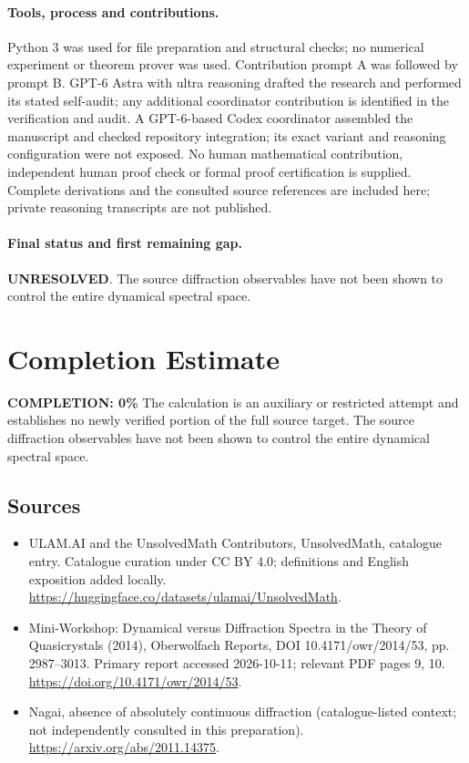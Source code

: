 \documentclass[11pt]{article}
\begin{document}
\paragraph{Tools, process and contributions.}
Python 3 was used for file preparation and structural checks; no numerical experiment or theorem prover was used. Contribution prompt A was followed by prompt B. GPT-6 Astra with ultra reasoning drafted the research and performed its stated self-audit; any additional coordinator contribution is identified in the verification and audit. A GPT-6-based Codex coordinator assembled the manuscript and checked repository integration; its exact variant and reasoning configuration were not exposed. No human mathematical contribution, independent human proof check or formal proof certification is supplied. Complete derivations and the consulted source references are included here; private reasoning transcripts are not published.

\paragraph{Final status and first remaining gap.}
\textbf{UNRESOLVED}. The source diffraction observables have not been shown to control the entire dynamical spectral space.

\section{Completion Estimate}
\noindent\textbf{COMPLETION: 0\%}
The calculation is an auxiliary or restricted attempt and establishes no newly verified portion of the full source target. The source diffraction observables have not been shown to control the entire dynamical spectral space.

\subsection{Sources}
\begin{itemize}
\item[\hypertarget{source:statement:1}{S1}] ULAM.AI and the UnsolvedMath Contributors, UnsolvedMath, catalogue entry. Catalogue curation under CC BY 4.0; definitions and English exposition added locally.
\url{https://huggingface.co/datasets/ulamai/UnsolvedMath}.
\item[\hypertarget{source:statement:2}{S2}] Mini-Workshop: Dynamical versus Diffraction Spectra in the Theory of Quasicrystals (2014), Oberwolfach Reports, DOI 10.4171/owr/2014/53, pp. 2987--3013. Primary report accessed 2026-10-11; relevant PDF pages 9, 10.
\url{https://doi.org/10.4171/owr/2014/53}.
\item[\hypertarget{source:statement:3}{S3}] Nagai, absence of absolutely continuous diffraction (catalogue-listed context; not independently consulted in this preparation).
\url{https://arxiv.org/abs/2011.14375}.
\end{itemize}
\label{end:statement}
\end{document}
